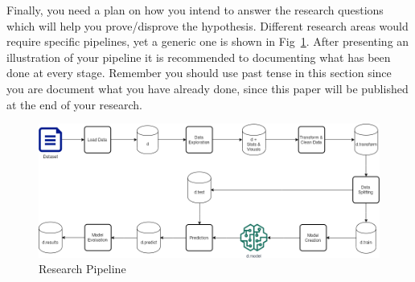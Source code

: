 \par Finally, you need a plan on how you intend to answer the research questions which will help you prove/disprove the hypothesis. Different research areas would require specific pipelines, yet a generic one is shown in Fig~\ref{fig:Pipeline}. After presenting an illustration of your pipeline it is recommended to documenting what has been done at every stage. Remember you should use past tense in this section since you are document what you have already done, since this paper will be published at the end of your research.

\begin{figure}[ht]
    \includegraphics[scale=0.25]{includes/pipeline.png}
    \centering
    \caption{Research Pipeline}
    \label{fig:Pipeline}
\end{figure}